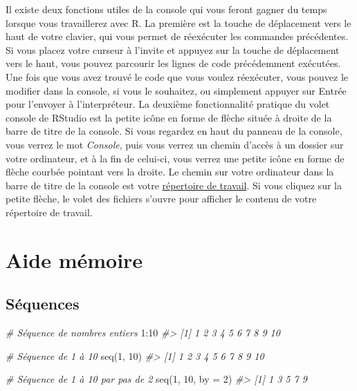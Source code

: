 \documentclass[
  french,
]{scrbook}
\newenvironment{Shaded}{\begin{snugshade}}{\end{snugshade}}
\newcommand{\AttributeTok}[1]{\textcolor[rgb]{0.77,0.63,0.00}{#1}}
\newcommand{\CommentTok}[1]{\textcolor[rgb]{0.56,0.35,0.01}{\textit{#1}}}
\newcommand{\DecValTok}[1]{\textcolor[rgb]{0.00,0.00,0.81}{#1}}
\newcommand{\FunctionTok}[1]{\textcolor[rgb]{0.00,0.00,0.00}{#1}}
\newcommand{\NormalTok}[1]{#1}
\newcommand{\SpecialCharTok}[1]{\textcolor[rgb]{0.00,0.00,0.00}{#1}}
\begin{document}
\begin{tcolorbox}[fonttitle=\sffamily\bfseries\large,title=Conseil,colframe=darkcyan]

Il existe deux fonctions utiles de la console qui vous feront gagner du temps lorsque vous travaillerez avec R. La première est la touche de déplacement vers le haut de votre clavier, qui vous permet de réexécuter les commandes précédentes. Si vous placez votre curseur à l'invite et appuyez sur la touche de déplacement vers le haut, vous pouvez parcourir les lignes de code précédemment exécutées. Une fois que vous avez trouvé le code que vous voulez réexécuter, vous pouvez le modifier dans la console, si vous le souhaitez, ou simplement appuyer sur Entrée pour l'envoyer à l'interpréteur. La deuxième fonctionnalité pratique du volet console de RStudio est la petite icône en forme de flèche située à droite de la barre de titre de la console. Si vous regardez en haut du panneau de la console, vous verrez le mot \emph{Console}, puis vous verrez un chemin d'accès à un dossier sur votre ordinateur, et à la fin de celui-ci, vous verrez une petite icône en forme de flèche courbée pointant vers la droite. Le chemin sur votre ordinateur dans la barre de titre de la console est votre \protect\hyperlink{projets}{répertoire de travail}. Si vous cliquez sur la petite flèche, le volet des fichiers s'ouvre pour afficher le contenu de votre répertoire de travail.

\end{tcolorbox}

\hypertarget{cheat-sheet}{%
\chapter{Aide mémoire}\label{cheat-sheet}}

\hypertarget{fonctions-sequences}{%
\section{Séquences}\label{fonctions-sequences}}

\begin{Shaded}
\begin{Highlighting}[]
\CommentTok{\# Séquence de nombres entiers}
\DecValTok{1}\SpecialCharTok{:}\DecValTok{10}
\CommentTok{\#\textgreater{}  [1]  1  2  3  4  5  6  7  8  9 10}
\end{Highlighting}
\end{Shaded}

\begin{Shaded}
\begin{Highlighting}[]
\CommentTok{\# Séquence de 1 à 10}
\FunctionTok{seq}\NormalTok{(}\DecValTok{1}\NormalTok{, }\DecValTok{10}\NormalTok{)}
\CommentTok{\#\textgreater{}  [1]  1  2  3  4  5  6  7  8  9 10}

\CommentTok{\# Séquence de 1 à 10 par pas de 2}
\FunctionTok{seq}\NormalTok{(}\DecValTok{1}\NormalTok{, }\DecValTok{10}\NormalTok{, }\AttributeTok{by =} \DecValTok{2}\NormalTok{)}
\CommentTok{\#\textgreater{} [1] 1 3 5 7 9}
\end{Highlighting}
\end{Shaded}
\end{document}
